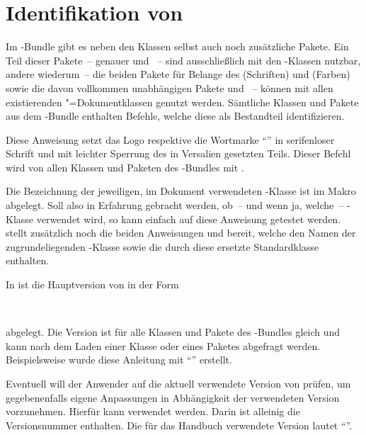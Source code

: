 \section{Identifikation von \TUDScript}
%
Im \TUDScript-Bundle gibt es neben den Klassen selbst auch noch zusätzliche 
Pakete. Ein Teil dieser Pakete~-- genauer  und 
~-- sind ausschließlich mit den \TUDScript-Klassen nutzbar,
andere wiederum~-- die beiden Pakete für Belange des \CDs {}
(Schriften) und  (Farben) sowie die davon vollkommen 
unabhängigen Pakete  und ~-- können mit 
allen existierenden "=Dokumentklassen genutzt werden. Sämtliche 
Klassen und Pakete aus dem \TUDScript-Bundle enthalten Befehle, welche diese 
als Bestandteil identifizieren.

\begin{Declaration}[v2.04]{}
\printdeclarationlist%
%
Diese Anweisung setzt das Logo respektive die Wortmarke \enquote{\TUDScript{}} 
in serifenloser Schrift und mit leichter Sperrung des in Versalien gesetzten 
Teils. Dieser Befehl wird von allen Klassen und Paketen des \TUDScript-Bundles 
mit .
\end{Declaration}

\begin{Declaration}[v2.04]{}
\printdeclarationlist%
%
Die Bezeichnung der jeweiligen, im Dokument verwendeten \TUDScript-Klasse ist 
im Makro  abgelegt. Soll also in Erfahrung gebracht 
werden, ob~-- und wenn ja, welche~-- \TUDScript-Klasse verwendet wird, so kann 
einfach auf diese Anweisung getestet werden. \KOMAScript{} stellt zusätzlich 
noch die beiden Anweisungen  und  
bereit, welche den Namen der zugrundeliegenden \KOMAScript-Klasse sowie die 
durch diese ersetzte Standardklasse enthalten.
\end{Declaration}

\begin{Declaration}[v2.04]{}
\begin{Declaration}[v2.05]{}
\printdeclarationlist%
%
In  ist die Hauptversion von \TUDScript in der Form
\begin{quoting}
~~
\end{quoting}
abgelegt. Die Version ist für alle Klassen und Pakete des \TUDScript-Bundles
gleich und kann nach dem Laden einer Klasse oder eines Paketes abgefragt 
werden. Beispielsweise wurde diese Anleitung mit \enquote{\TUDScriptVersion{}} 
erstellt.

Eventuell will der Anwender auf die aktuell verwendete Version von \TUDScript 
prüfen, um gegebenenfalls eigene Anpassungen in Abhängigkeit der verwendeten 
Version vorzunehmen. Hierfür kann  verwendet 
werden. Darin ist alleinig die Versionsnummer enthalten. Die für das Handbuch 
verwendete Version lautet \enquote{\TUDScriptVersionNumber{}}.
\end{Declaration}
\end{Declaration}
